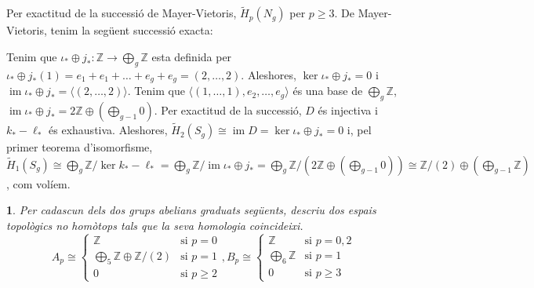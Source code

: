 \documentclass[compress,10pt]{article}
\newtheorem{enunciat}{}
\theoremstyle{definition}
\DeclareMathOperator{\im}{im}
\begin{document}
Per exactitud de la successió de Mayer-Vietoris, $\widetilde{H}_{p}(N_{g})$ per $p\geq3$. De Mayer-Vietoris, tenim la següent successió exacta:
\begin{center}
\end{center}
Tenim que $\iota_{*}\oplus j_{*}:\mathbb{Z}\rightarrow\bigoplus_{g}\mathbb{Z}$ esta definida per $\iota_{*}\oplus j_{*}(1)=e_{1}+e_{1}+\ldots+e_{g}+e_{g}=(2,\ldots,2)$. Aleshores, $\ker{\iota_{*}\oplus j_{*}}=0$ i $\im{\iota_{*}\oplus j_{*}}=\langle(2,\ldots,2)\rangle$. Tenim que $\langle(1,\ldots,1),e_{2},\ldots,e_{g}\rangle$ és una base de $\bigoplus_{g}\mathbb{Z}$, $\im{\iota_{*}\oplus j_{*}}=2\mathbb{Z}\oplus(\bigoplus_{g-1}0)$. Per exactitud de la successió, $D$ és injectiva i $k_{*}-\ell_{*}$ és exhaustiva. Aleshores, $\widetilde{H}_{2}(S_{g})\cong\im{D}=\ker{\iota_{*}\oplus j_{*}}=0$ i, pel primer teorema d'isomorfisme, $\widetilde{H}_{1}(S_{g})\cong\bigoplus_{g}\mathbb{Z}/\ker{k_{*}-\ell_{*}}=\bigoplus_{g}\mathbb{Z}/\im{\iota_{*}\oplus j_{*}}=\bigoplus_{g}\mathbb{Z}/(2\mathbb{Z}\oplus(\bigoplus_{g-1}0))\cong\mathbb{Z}/(2)\oplus(\bigoplus_{g-1}\mathbb{Z})$, com volíem.
\begin{enunciat}
    Per cadascun dels dos grups abelians graduats següents, descriu dos espais topològics no homòtops tals que la seva homologia coincideixi.
    \begin{equation*}
    A_{p}\cong\begin{cases}
        \mathbb{Z}&\textrm{si $p=0$}\\
        \bigoplus_{5}\mathbb{Z}\oplus\mathbb{Z}/(2)&\textrm{si $p=1$}\\
        0&\textrm{si $p\geq2$}
    \end{cases},
    B_{p}\cong\begin{cases}
        \mathbb{Z}&\textrm{si $p=0,2$}\\
        \bigoplus_{6}\mathbb{Z}&\textrm{si $p=1$}\\
        0&\textrm{si $p\geq3$}
    \end{cases}
    \end{equation*}
\end{enunciat}
\end{document}
